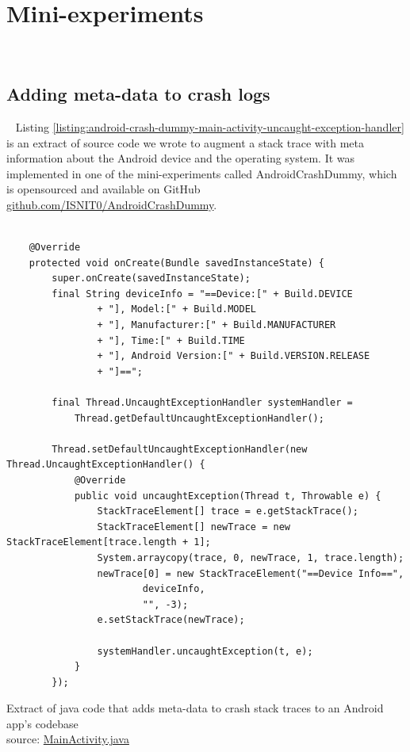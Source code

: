 \chapter{Mini-experiments}~\label{appendix-mini-experiments}

\section{Adding meta-data to crash logs}~\label{app-mini-experiment-meta-dat-to-crash-logs}
Listing \ref{listing:android-crash-dummy-main-activity-uncaught-exception-handler} is an extract of source code we wrote to augment a stack trace with meta information about the Android device and the operating system. It was implemented in one of the mini-experiments called AndroidCrashDummy, which is opensourced and available on GitHub \href{https://github.com/ISNIT0/AndroidCrashDummy}{github.com/ISNIT0/AndroidCrashDummy}.

\begin{listing}
\begin{verbatim}

    @Override
    protected void onCreate(Bundle savedInstanceState) {
        super.onCreate(savedInstanceState);
        final String deviceInfo = "==Device:[" + Build.DEVICE
                + "], Model:[" + Build.MODEL
                + "], Manufacturer:[" + Build.MANUFACTURER
                + "], Time:[" + Build.TIME
                + "], Android Version:[" + Build.VERSION.RELEASE
                + "]==";

        final Thread.UncaughtExceptionHandler systemHandler = 
            Thread.getDefaultUncaughtExceptionHandler();

        Thread.setDefaultUncaughtExceptionHandler(new Thread.UncaughtExceptionHandler() {
            @Override
            public void uncaughtException(Thread t, Throwable e) {
                StackTraceElement[] trace = e.getStackTrace();
                StackTraceElement[] newTrace = new StackTraceElement[trace.length + 1];
                System.arraycopy(trace, 0, newTrace, 1, trace.length);
                newTrace[0] = new StackTraceElement("==Device Info==",
                        deviceInfo,
                        "", -3);
                e.setStackTrace(newTrace);

                systemHandler.uncaughtException(t, e);
            }
        });
\end{verbatim}
\caption[Extract of java code that adds meta-data to crash stack traces to an Android app's codebase]{Extract of java code that adds meta-data to crash stack traces to an Android app's codebase\\source: \href{https://github.com/ISNIT0/AndroidCrashDummy/blob/master/app/src/main/java/com/example/user/androidtestapp/MainActivity.java}{MainActivity.java}}
\label{listing:android-crash-dummy-main-activity-uncaught-exception-handler}
\end{listing}

